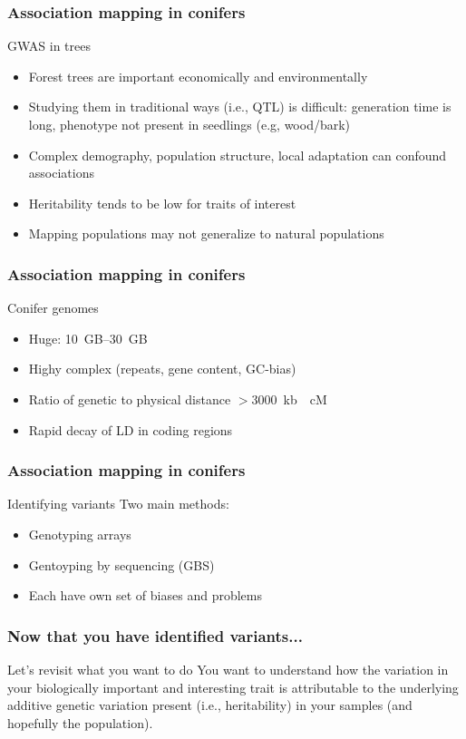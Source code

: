 \begin{frame}
\frametitle{Association mapping in conifers}
\begin{block}{GWAS in trees}
\begin{itemize}
\item{Forest trees are important economically and environmentally}
\item{Studying them in traditional ways (i.e., QTL) is difficult: generation
time is long, phenotype not present in seedlings (e.g, wood/bark)}
\item{Complex demography, population structure, local adaptation can confound 
associations}
\item{Heritability tends to be low for traits of interest}
\item{Mapping populations may not generalize to natural populations}
\end{itemize}
\end{block}
\tiny
\citet{Uchiyama:2013ci}
\end{frame}

\begin{frame}
\frametitle{Association mapping in conifers}
\begin{block}{Conifer genomes}
\begin{itemize}
\item{Huge: \SIrange{10}{30}{GB}}
\item{Highy complex (repeats, gene content, GC-bias)}
\item{Ratio of genetic to physical distance $>$\SI{3000}{kb \per cM}}
\item{Rapid decay of LD in coding regions}
\end{itemize}
\end{block}
\tiny
\citet{Uchiyama:2013ci,Hirschhorn:2005cka}
\end{frame}

\begin{frame}
\frametitle{Association mapping in conifers}
\begin{block}{Identifying variants}
Two main methods:
\begin{itemize}
\item{Genotyping arrays}
\item{Gentoyping by sequencing (GBS)}
\item{Each have own set of biases and problems}
\end{itemize}
\end{block}
\end{frame}

\begin{frame}
\frametitle{Now that you have identified variants...}
\begin{block}{Let's revisit what you want to do}
\centering
You want to understand how the variation in your biologically important and
interesting trait is attributable to the underlying additive genetic variation 
present (i.e., heritability) in your samples (and hopefully the population).
\end{block}
\end{frame}

